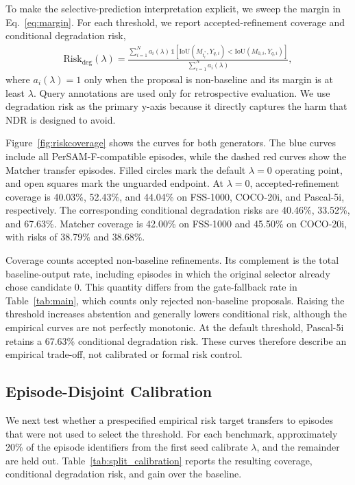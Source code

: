 \documentclass{CVM}
\begin{document}
To make the selective-prediction interpretation explicit, we sweep the margin in Eq.~\eqref{eq:margin}. For each threshold, we report accepted-refinement coverage and conditional degradation risk,
\begin{align}
\mathrm{Risk}_{\mathrm{deg}}(\lambda)=
\frac{\sum_{i=1}^{N}a_i(\lambda)\,\mathbb{1}\left[
\mathrm{IoU}(M_{t_i^*},Y_{q,i})<\mathrm{IoU}(M_{0,i},Y_{q,i})
\right]}
{\sum_{i=1}^{N}a_i(\lambda)},
\label{eq:riskcoverage}
\end{align}
where $a_i(\lambda)=1$ only when the proposal is non-baseline and its margin is at least $\lambda$. Query annotations are used only for retrospective evaluation. We use degradation risk as the primary y-axis because it directly captures the harm that NDR is designed to avoid.

Figure~\ref{fig:riskcoverage} shows the curves for both generators. The blue curves include all PerSAM-F-compatible episodes, while the dashed red curves show the Matcher transfer episodes. Filled circles mark the default $\lambda=0$ operating point, and open squares mark the unguarded endpoint. At $\lambda=0$, accepted-refinement coverage is 40.03\%, 52.43\%, and 44.04\% on FSS-1000, COCO-20i, and Pascal-5i, respectively. The corresponding conditional degradation risks are 40.46\%, 33.52\%, and 67.63\%. Matcher coverage is 42.00\% on FSS-1000 and 45.50\% on COCO-20i, with risks of 38.79\% and 38.68\%.

Coverage counts accepted non-baseline refinements. Its complement is the total baseline-output rate, including episodes in which the original selector already chose candidate 0. This quantity differs from the gate-fallback rate in Table~\ref{tab:main}, which counts only rejected non-baseline proposals. Raising the threshold increases abstention and generally lowers conditional risk, although the empirical curves are not perfectly monotonic. At the default threshold, Pascal-5i retains a 67.63\% conditional degradation risk. These curves therefore describe an empirical trade-off, not calibrated or formal risk control.

\subsection{Episode-Disjoint Calibration}

We next test whether a prespecified empirical risk target transfers to episodes that were not used to select the threshold. For each benchmark, approximately 20\% of the episode identifiers from the first seed calibrate $\lambda$, and the remainder are held out. Table~\ref{tab:split_calibration} reports the resulting coverage, conditional degradation risk, and gain over the baseline.
\end{document}
